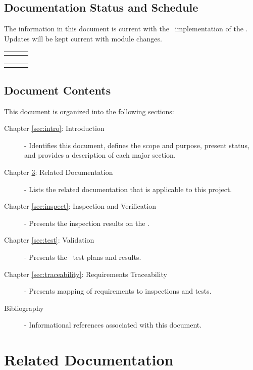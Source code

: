 \documentclass[twoside,11pt,titlepage]{report}
\begin{document}
\section{Documentation Status and Schedule}
The information in this document is current with the \TrickHLAid\
implementation of the \MODEL. Updates will be kept current with
module changes.

\begin{tabular}{||l|l|l|} \hline
\documentHistory
\end{tabular}

\begin{tabular}{||l|l|l|} \hline
\DocumentChangeHistory
\end{tabular}

\section{Document Contents}
This document is organized into the following sections:

\begin{description}

\item[Chapter \ref{sec:intro}: Introduction] -
Identifies this document, defines the scope and purpose, present status,
and provides a description of each major section.

\item[Chapter \ref{sec:docs}: Related Documentation] -
Lists the related documentation that is applicable to this project.

\item[Chapter \ref{sec:inspect}: Inspection and Verification] -
Presents the inspection results on the \MODEL.

\item[Chapter \ref{sec:test}: Validation] -
Presents the \MODEL\ test plans and results.

\item[Chapter \ref{sec:traceability}: Requirements Traceability] -
Presents mapping of requirements to inspections and tests.

\item[Bibliography] -
Informational references associated with this document.

\end{description}

\chapter{Related Documentation}\label{sec:docs}
\end{document}
